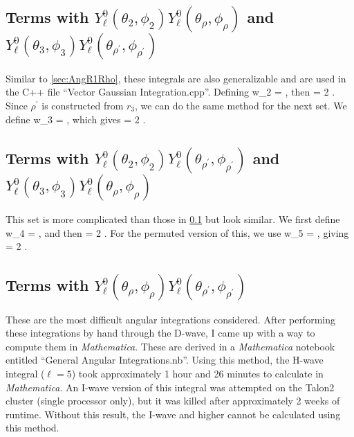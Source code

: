 \documentclass[Dissertation.tex]{subfiles}
\begin{document}
\subsection{Terms with \texorpdfstring{$Y_\ell^0(\theta_2, \phi_2) Y_\ell^0(\theta_{\rho}, \phi_{\rho})$}{Y2-Yrho} and \texorpdfstring{$Y_\ell^0(\theta_3, \phi_3) Y_\ell^0(\theta_{\rho^\prime}, \phi_{\rho^\prime})$}{Y3-Yrho'}}
\label{sec:AngR2Rho}

Similar to \cref{sec:AngR1Rho}, these integrals are also generalizable and are used in the C++ file ``Vector Gaussian Integration.cpp''. Defining
\beq
w_2 = ,
\eeq
then
\beq
{} = 2 \pi {}.
\eeq
Since $\rho^\prime$ is constructed from $r_3$, we can do the same method for the next set. We define
\beq
w_3 = ,
\eeq
which gives
\beq
{} = 2 \pi {}.
\eeq


\subsection{Terms with \texorpdfstring{$Y_\ell^0(\theta_2, \phi_2) Y_\ell^0(\theta_{\rho^\prime}, \phi_{\rho^\prime})$}{Y2-Yrho'} and \texorpdfstring{$Y_\ell^0(\theta_3, \phi_3) Y_\ell^0(\theta_{\rho}, \phi_{\rho})$}{Y3-Yrho}}
\label{sec:AngR2Rhop}

This set is more complicated than those in \cref{sec:AngR2Rho} but look similar. We first define
\beq
w_4 = ,
\eeq
and then
\beq
{} = 2 \pi {}.
\eeq
For the permuted version of this, we use
\beq
w_5 = ,
\eeq
giving
\beq
{} = 2 \pi {}.
\eeq


\subsection{Terms with \texorpdfstring{$Y_\ell^0(\theta_\rho, \phi_\rho) Y_\ell^0(\theta_{\rho^\prime}, \phi_{\rho^\prime})$}{Yrho-Yrho'}}

These are the most difficult angular integrations considered. After performing these integrations by hand through the D-wave, I came up with a way to compute them in \emph{Mathematica}. These are derived in a \emph{Mathematica} notebook entitled ``General Angular Integrations.nb''. Using this method, the H-wave integral ($\ell = 5$) took approximately 1 hour and 26 minutes to calculate in \emph{Mathematica}. An I-wave version of this integral was attempted on the Talon2 cluster (single processor only), but it was killed after approximately 2 weeks of runtime. Without this result, the I-wave and higher cannot be calculated using this method.
\end{document}
